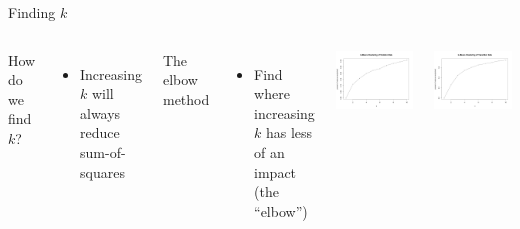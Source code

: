 \documentclass[12pt]{beamer}
\begin{document}
\begin{frame}{Finding $k$}
\begin{columns}[C]
	\vfill
	How do we find $k$?
	\begin{itemize}
		\item Increasing $k$ will always reduce sum-of-squares
	\end{itemize}
	\vfill
	The elbow method
	\begin{itemize}
		\item Find where increasing $k$ has less of an impact (the ``elbow'')
	\end{itemize}
	\vfill
	\includegraphics[width=\textwidth]{plots/elbowViolation}
	
	\includegraphics[width=\textwidth]{plots/elbowTransition}
\end{columns}
\end{frame}
\end{document}
